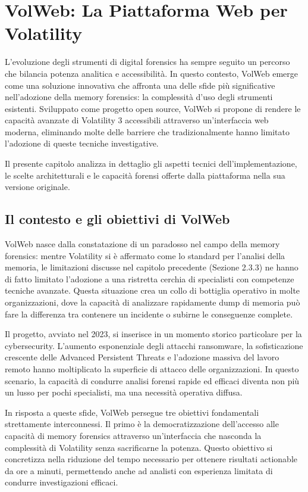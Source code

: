 \chapter{VolWeb: La Piattaforma Web per Volatility}

L'evoluzione degli strumenti di digital forensics ha sempre seguito un percorso che bilancia potenza analitica e accessibilità. In questo contesto, VolWeb emerge come una soluzione innovativa che affronta una delle sfide più significative nell'adozione della memory forensics: la complessità d'uso degli strumenti esistenti. Sviluppato come progetto open source, VolWeb si propone di rendere le capacità avanzate di Volatility 3 accessibili attraverso un'interfaccia web moderna, eliminando molte delle barriere che tradizionalmente hanno limitato l'adozione di queste tecniche investigative.

Il presente capitolo analizza in dettaglio gli aspetti tecnici dell'implementazione, le scelte architetturali e le capacità forensi offerte dalla piattaforma nella sua versione originale.

\section{Il contesto e gli obiettivi di VolWeb}

VolWeb \cite{volweb2024} nasce dalla constatazione di un paradosso nel campo della memory forensics: mentre Volatility si è affermato come lo standard per l'analisi della memoria, le limitazioni discusse nel capitolo precedente (Sezione 2.3.3) ne hanno di fatto limitato l'adozione a una ristretta cerchia di specialisti con competenze tecniche avanzate. Questa situazione crea un collo di bottiglia operativo in molte organizzazioni, dove la capacità di analizzare rapidamente dump di memoria può fare la differenza tra contenere un incidente o subirne le conseguenze complete.

Il progetto, avviato nel 2023, si inserisce in un momento storico particolare per la cybersecurity. L'aumento esponenziale degli attacchi ransomware, la sofisticazione crescente delle Advanced Persistent Threats e l'adozione massiva del lavoro remoto hanno moltiplicato la superficie di attacco delle organizzazioni. In questo scenario, la capacità di condurre analisi forensi rapide ed efficaci diventa non più un lusso per pochi specialisti, ma una necessità operativa diffusa.

In risposta a queste sfide, VolWeb persegue tre obiettivi fondamentali strettamente interconnessi. Il primo è la democratizzazione dell'accesso alle capacità di memory forensics attraverso un'interfaccia che nasconda la complessità di Volatility senza sacrificarne la potenza. Questo obiettivo si concretizza nella riduzione del tempo necessario per ottenere risultati actionable da ore a minuti, permettendo anche ad analisti con esperienza limitata di condurre investigazioni efficaci. 

